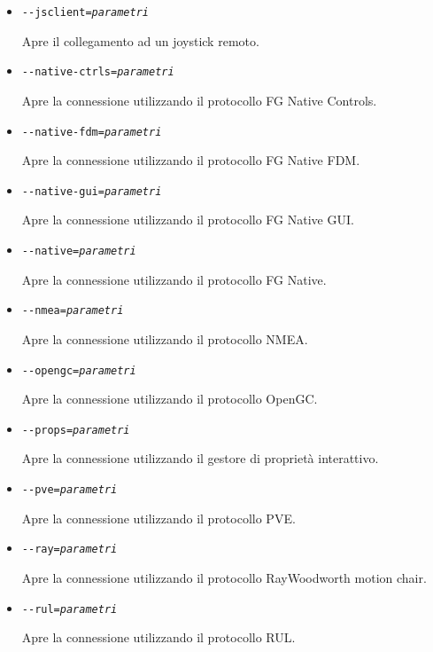 {\begin{itemize}
  \item{\texttt{-$ $-jsclient={\it parametri}}}

    Apre il collegamento ad un joystick remoto.

  \item{\texttt{-$ $-native-ctrls={\it parametri}}}

    Apre la connessione utilizzando il protocollo FG Native Controls.

  \item{\texttt{-$ $-native-fdm={\it parametri}}}

    Apre la connessione utilizzando il protocollo FG Native FDM.

  \item{\texttt{-$ $-native-gui={\it parametri}}}

    Apre la connessione utilizzando il protocollo FG Native GUI.

  \item{\texttt{-$ $-native={\it parametri}}}

    Apre la connessione utilizzando il protocollo FG Native.

  \item{\texttt{-$ $-nmea={\it parametri}}}

    Apre la connessione utilizzando il protocollo NMEA.

  \item{\texttt{-$ $-opengc={\it parametri}}}

    Apre la connessione utilizzando il protocollo OpenGC.

  \item{\texttt{-$ $-props={\it parametri}}}

    Apre la connessione utilizzando il gestore di propriet\`{a} interattivo.

  \item{\texttt{-$ $-pve={\it parametri}}}

    Apre la connessione utilizzando il protocollo PVE.

  \item{\texttt{-$ $-ray={\it parametri}}}

    Apre la connessione utilizzando il protocollo RayWoodworth motion chair.

  \item{\texttt{-$ $-rul={\it parametri}}}

    Apre la connessione utilizzando il protocollo RUL.

  \end{itemize}
}
